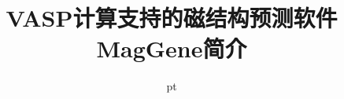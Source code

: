 \documentclass[cjk,slidestop,compress,mathserif,blue]{beamer}
\begin{document}

\renewcommand{\figurename}{\tiny{\bf Fig}.}
\renewcommand{\tablename}{\tiny{\bf Tab}.}
\renewcommand{\thesubfigure}{\tiny(\alph{subfigure})}  %

%

\title{\rm{VASP}计算支持的磁结构预测软件\\\rm{MagGene}简介}

\institute[BCC]{\inst{}%
 \vskip 45pt 格致斯创(北京)科技有限公司}
\date[\today] %
{	%
 pt {\fontsize{8.2pt}{6.2pt}}
}
\end{document}
